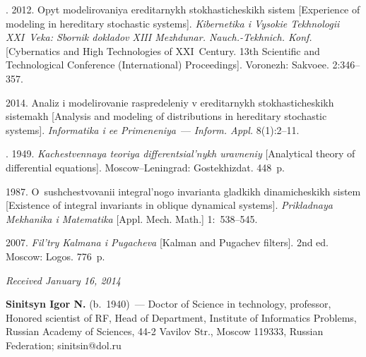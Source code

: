\begin{multicols}{2}
{{\begin{thebibliography}{99}
. 2012.
Opyt modelirovaniya ereditarnykh stokhasticheskikh sistem
[Experience of modeling in hereditary stochastic systems].
\textit{Kibernetika i Vysokie Tekhnologii XXI~Veka: Sbornik dokladov
XIII Mezhdunar. Nauch.-Tekhnich. Konf.}
[Cybernatics and High Technologies of XXI~Century.
13th  Scientific and Technological Conference (International) Proceedings].
Voronezh: Sakvoee. 2:346--357.


  2014.
Analiz i modelirovanie raspredeleniy v ereditarnykh stokhasticheskikh sistemakh
[Analysis and modeling of distributions in hereditary stochastic systems].
\textit{Informatika i ee Primeneniya}~--- \textit{Inform. Appl.} 8(1):2--11.



.  1949.
\textit{Ka\-chest\-ven\-naya teoriya differentsial'nykh uravneniy}
[Analytical theory of differential equations].
Moscow--Leningrad: Gostekhizdat. 448~p.

 1987.
O~sushchestvovanii integral'nogo invarianta gladkikh dinamicheskikh sistem
[Existence of integral invariants in oblique dynamical systems].
\textit{Prikladnaya Mekhanika i Matematika}
[Appl. Mech. Math.] 1:~538--545.

 2007.
\textit{Fil'try Kalmana i Pugacheva} [Kalman and Pugachev filters].
 2nd ed. Moscow: Logos.  776~p.


       \end{thebibliography}
} }


\end{multicols}

\vspace*{-12pt}

\hfill{\small\textit{Received January 16, 2014}}

\vspace*{-24pt}


\Contrl

\vspace*{-2pt}

\noindent
\textbf{Sinitsyn Igor N.} (b.\ 1940)~---
Doctor of Science in technology, professor, Honored scientist of RF, Head of Department, Institute of
Informatics Problems, Russian Academy of Sciences, 44-2 Vavilov Str., Moscow 119333, Russian
Federation; sinitsin@dol.ru

\vspace*{-12pt}

 \label{end\stat}

\renewcommand{\bibname}{\protect\rm Литература}